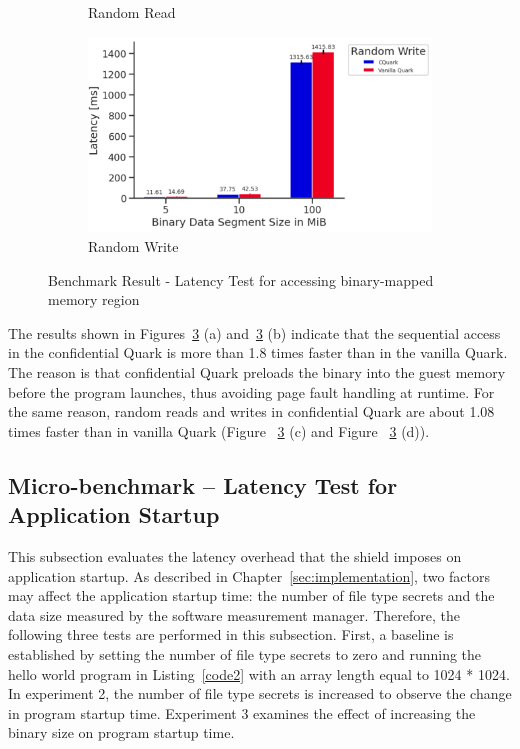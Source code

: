 \begin{figure}[!htb]
\begin{subfigure}[b]{0.5\linewidth}
      \caption{Random Read} 
      \label{fig7:c} 
    \end{subfigure}%
    \begin{subfigure}[b]{0.5\linewidth}
      \centering
      \includegraphics[width=0.9\linewidth]{images/Random_Write.PNG} 
      \caption{Random Write} 
      \label{fig7:d} 
    \end{subfigure} 
    \caption{Benchmark Result - Latency Test for accessing binary-mapped memory region}
    \label{fig7} 
\end{figure}



The results shown in Figures~\ref{fig7} (a) and~\ref{fig7} (b) indicate that the sequential access in the confidential Quark is more than 1.8 times faster than in the vanilla Quark. The reason is that confidential Quark preloads the binary into the guest memory before the program launches, thus avoiding page 
fault handling at runtime. For the same reason, random reads and writes in confidential Quark are about 1.08 times faster than in vanilla Quark (Figure ~\ref{fig7} (c) and Figure ~\ref{fig7} (d)).


\subsection{Micro-benchmark – Latency Test for Application Startup}
\label{micro_app_start_up}

This subsection evaluates the latency overhead that the shield imposes on application startup. As described in Chapter~\ref{sec:implementation}, two factors may affect the application startup time: the number of file type secrets and the data size measured by the software measurement manager. Therefore, 
the following three tests are performed in this subsection. First, a baseline is established by setting the number of file type secrets to zero and running the hello world program in Listing~\ref{code2} with an array length equal to 1024 * 1024. 
In experiment 2, the number of file type secrets is increased to observe the change in program startup time. Experiment 3 examines the effect of increasing the binary size on program startup time.


